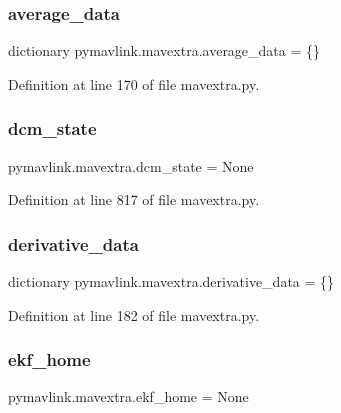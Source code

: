 \subsubsection{\texorpdfstring{average\_data}{average\_data}}
{\footnotesize\ttfamily dictionary pymavlink.\+mavextra.\+average\+\_\+data = \{\}}



Definition at line 170 of file mavextra.\+py.

\mbox{\label{namespacepymavlink_1_1mavextra_af3b8d2455323dd429c14e6fa95e10e12}} 
\subsubsection{\texorpdfstring{dcm\_state}{dcm\_state}}
{\footnotesize\ttfamily pymavlink.\+mavextra.\+dcm\+\_\+state = None}



Definition at line 817 of file mavextra.\+py.

\mbox{\label{namespacepymavlink_1_1mavextra_a3254820968ce29e97fb197680e5df9bc}} 
\subsubsection{\texorpdfstring{derivative\_data}{derivative\_data}}
{\footnotesize\ttfamily dictionary pymavlink.\+mavextra.\+derivative\+\_\+data = \{\}}



Definition at line 182 of file mavextra.\+py.

\mbox{\label{namespacepymavlink_1_1mavextra_a80175ecaee74959808255a74533fdbb5}} 
\subsubsection{\texorpdfstring{ekf\_home}{ekf\_home}}
{\footnotesize\ttfamily pymavlink.\+mavextra.\+ekf\+\_\+home = None}



